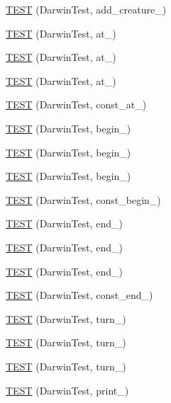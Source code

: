 \begin{DoxyCompactItemize}
\item 
\hyperlink{TestDarwin_8c_09_09_aaa4de3a95dbc4270e966be1a18c10cc3}{T\-E\-S\-T} (Darwin\-Test, add\-\_\-creature\-\_)
\item 
\hyperlink{TestDarwin_8c_09_09_a5bcdb93be2022bfb3e8e2d492cfd9d15}{T\-E\-S\-T} (Darwin\-Test, at\-\_)
\item 
\hyperlink{TestDarwin_8c_09_09_a9f888a3b2420490794c62e6140126cde}{T\-E\-S\-T} (Darwin\-Test, at\-\_)
\item 
\hyperlink{TestDarwin_8c_09_09_a11fb23f302b7127df55f1676d7463909}{T\-E\-S\-T} (Darwin\-Test, at\-\_)
\item 
\hyperlink{TestDarwin_8c_09_09_a8f75cab7c24fad104968a39cb1df814e}{T\-E\-S\-T} (Darwin\-Test, const\-\_\-at\-\_)
\item 
\hyperlink{TestDarwin_8c_09_09_ad7b5a137b7698d6dd709ffe50574d029}{T\-E\-S\-T} (Darwin\-Test, begin\-\_)
\item 
\hyperlink{TestDarwin_8c_09_09_af05aaeb0b7799b361ab340710b8c6ac2}{T\-E\-S\-T} (Darwin\-Test, begin\-\_)
\item 
\hyperlink{TestDarwin_8c_09_09_a8836b5511d7872952e346623c1979934}{T\-E\-S\-T} (Darwin\-Test, begin\-\_)
\item 
\hyperlink{TestDarwin_8c_09_09_ac867ed26d87c9c328cd283b8eed086a1}{T\-E\-S\-T} (Darwin\-Test, const\-\_\-begin\-\_)
\item 
\hyperlink{TestDarwin_8c_09_09_af816116c40671e55f1e3a97aab09053f}{T\-E\-S\-T} (Darwin\-Test, end\-\_)
\item 
\hyperlink{TestDarwin_8c_09_09_aea4b4bd1265f059a6887ed097ce37a70}{T\-E\-S\-T} (Darwin\-Test, end\-\_)
\item 
\hyperlink{TestDarwin_8c_09_09_aedf5bae87a9bf297c8b0f3de06c1b17f}{T\-E\-S\-T} (Darwin\-Test, end\-\_)
\item 
\hyperlink{TestDarwin_8c_09_09_a383a4b9bbf90742c683f7e9ace0f9762}{T\-E\-S\-T} (Darwin\-Test, const\-\_\-end\-\_)
\item 
\hyperlink{TestDarwin_8c_09_09_ac9555d43845e71d2848555e1b66e4fb3}{T\-E\-S\-T} (Darwin\-Test, turn\-\_)
\item 
\hyperlink{TestDarwin_8c_09_09_a62013fa86ba0c5a59acb68f2c72c1c3f}{T\-E\-S\-T} (Darwin\-Test, turn\-\_)
\item 
\hyperlink{TestDarwin_8c_09_09_abe48d94400eb21f26cf49a34af2204f6}{T\-E\-S\-T} (Darwin\-Test, turn\-\_)
\item 
\hyperlink{TestDarwin_8c_09_09_ade0cb5f230ba5d761e102a4acd4146bc}{T\-E\-S\-T} (Darwin\-Test, print\-\_)

\end{DoxyCompactItemize}
